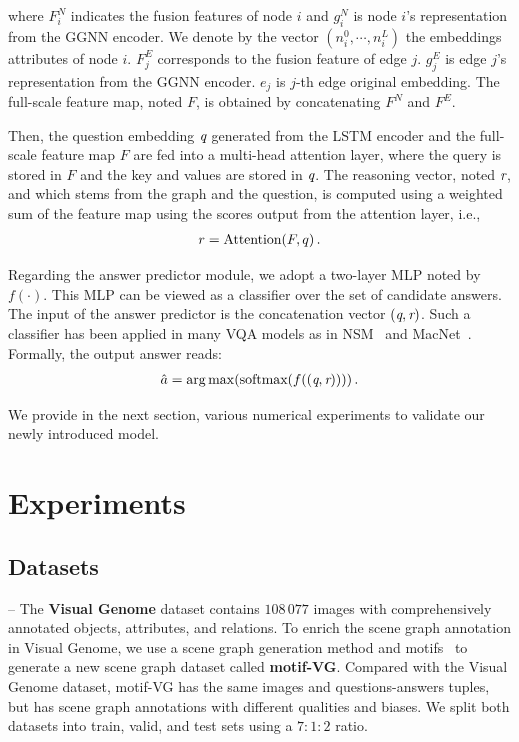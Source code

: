 \documentclass[letterpaper]{article} %
\begin{document}
where $F_i^N$ indicates the fusion features of node $i$ and $g_i^N$ is node $i$'s representation from the GGNN encoder. 
We denote by the vector $(n_i^0, \cdots,n_i^L)$ the embeddings attributes of node $i$. 
$F_j^E$ corresponds to the fusion feature of edge $j$. $g_j^E$ is edge $j$'s representation from the GGNN encoder. 
$e_j$ is $j$-th edge original embedding. 
The full-scale feature map, noted $F$, is obtained by concatenating $F^N$ and $F^E$.

Then, the question embedding $\emph{q}$ generated from the LSTM encoder and the full-scale feature map $F$ are fed into a multi-head attention layer, where the query is stored in $F$ and the key and values are stored in $\emph{q}$.
The reasoning vector, noted $\emph{r}$, and which stems from the graph and the question, is computed using a weighted sum of the feature map using the scores output from the attention layer, i.e.,
\begin{gather}\notag
    r = \text{Attention}(F, q) \, . 
\end{gather}

Regarding the answer predictor module, we adopt a two-layer MLP noted by $f(\cdot)$. 
This MLP can be viewed as a classifier over the set of candidate answers. 
The input of the answer predictor is the concatenation vector $(\emph{q},\emph{r})$. 
Such a classifier has been applied in many VQA models as in NSM~\cite{DBLP:conf/nips/HudsonM19} and MacNet~\cite{DBLP:conf/nips/LuYBP16}.
Formally, the output answer reads:
\begin{gather}\notag
    \hat{a} = \mathop{\arg\max}(\text{softmax}(f((\emph{q},\emph{r}))))\, .
\end{gather}

We provide in the next section, various numerical experiments to validate our newly introduced model.


\section{Experiments}\label{sec:experiments}

\subsection{Datasets}

-- The \textbf{Visual Genome} dataset contains $108 \, 077$ images with comprehensively annotated objects, attributes, and relations. To enrich the scene graph annotation in Visual Genome, we use a scene graph generation method and motifs~\cite{DBLP:conf/cvpr/ZellersYTC18} to generate a new scene graph dataset called \textbf{motif-VG}. 
Compared with the Visual Genome dataset, motif-VG has the same images and questions-answers tuples, but has scene graph annotations with different qualities and biases. 
We split both datasets into train, valid, and test sets using a $7:1:2$ ratio. 
\end{document}
